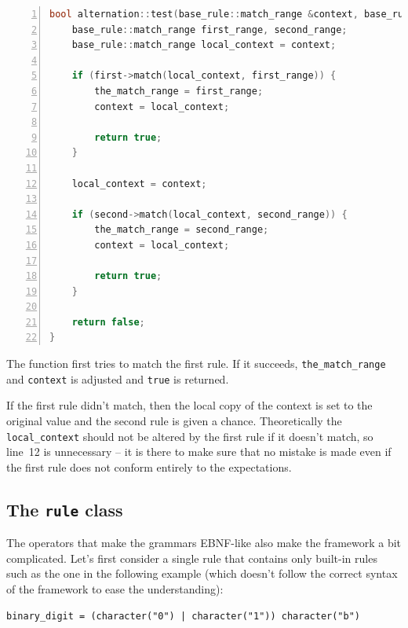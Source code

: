 \documentclass[12pt]{article}
\newcommand{\usubsec}[2]{\subsection*{#1}\label{subsec:#2}\addcontentsline{toc}{subsection}{#1}}
\begin{document}
\begin{center}
	\begin{minipage}[h]{0.8\textwidth}
		\begin{lstlisting}[language=C++, breaklines=true, numbers=left]
bool alternation::test(base_rule::match_range &context, base_rule::match_range &the_match_range) {
	base_rule::match_range first_range, second_range;
	base_rule::match_range local_context = context;

	if (first->match(local_context, first_range)) {
		the_match_range = first_range;
		context = local_context;

		return true;
	}
	
	local_context = context;

	if (second->match(local_context, second_range)) {
		the_match_range = second_range;
		context = local_context;

		return true;
	}
	
	return false;
}
		\end{lstlisting}
	\end{minipage}
\end{center}

The function first tries to match the first rule. If it succeeds, \texttt{the\_match\_range} and
\texttt{context} is adjusted and \texttt{true} is returned.

If the first rule didn't match, then the local copy of the context is set to the original value and the second
rule is given a chance. Theoretically the \texttt{local\_context} should not be altered by the first rule if
it doesn't match, so line~12 is unnecessary -- it is there to make sure that no mistake is made even if the
first rule does not conform entirely to the expectations.

\usubsec{The \texttt{rule} class}{rule}
The operators that make the grammars EBNF-like also make the framework a bit complicated. Let's first consider
a single rule that contains only built-in rules such as the one in the following example (which doesn't follow
the correct syntax of the framework to ease the understanding):

\begin{center}
	\begin{minipage}[h]{0.8\textwidth}
		\begin{lstlisting}[breaklines=true]
binary_digit = (character("0") | character("1")) character("b")
		\end{lstlisting}
	\end{minipage}
\end{center}
\end{document}
